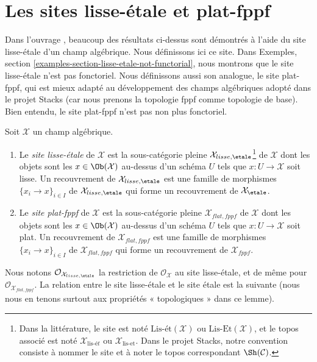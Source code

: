 \section{Les sites lisse-étale et plat-fppf}
\label{section-lisse-etale}

\noindent
Dans l'ouvrage \cite{LM-B}, beaucoup des résultats ci-dessus sont démontrés à l'aide du
site lisse-étale d'un champ algébrique. Nous définissons ici ce site.
Dans Exemples, section \ref{examples-section-lisse-etale-not-functorial},
nous montrons que le site lisse-étale n'est pas fonctoriel.
Nous définissons aussi son analogue, le site plat-fppf, qui est mieux adapté
au développement des champs algébriques adopté dans le projet Stacks
(car nous prenons la topologie fppf comme topologie de base). Bien entendu, le
site plat-fppf n'est pas non plus fonctoriel.

\begin{definition}
\label{definition-lisse-etale}
Soit $\mathcal{X}$ un champ algébrique.
\begin{enumerate}
\item Le {\it site lisse-étale} de $\mathcal{X}$ est la sous-catégorie pleine
$\mathcal{X}_{lisse,\etale}$\footnote{Dans la littérature, le
site est noté $\text{Lis-\'et}(\mathcal{X})$ ou
$\text{Lis-Et}(\mathcal{X})$, et le topos associé est noté
$\mathcal{X}_{\text{lis-\'e}t}$ ou $\mathcal{X}_{\text{lis-et}}$.
Dans le projet Stacks, notre convention consiste à nommer le site et à
noter le topos correspondant $\Sh(\mathcal{C})$.} de $\mathcal{X}$
dont les objets sont les $x \in \Ob(\mathcal{X})$ au-dessus d'un schéma $U$
tels que $x : U \to \mathcal{X}$ soit lisse. Un recouvrement de
$\mathcal{X}_{lisse,\etale}$ est une famille de morphismes
$\{x_i \to x\}_{i \in I}$ de $\mathcal{X}_{lisse,\etale}$
qui forme un recouvrement de $\mathcal{X}_\etale$.
\item Le {\it site plat-fppf} de $\mathcal{X}$ est la sous-catégorie pleine
$\mathcal{X}_{flat,fppf}$ de $\mathcal{X}$
dont les objets sont les $x \in \Ob(\mathcal{X})$ au-dessus d'un schéma $U$
tels que $x : U \to \mathcal{X}$ soit plat. Un recouvrement de
$\mathcal{X}_{flat,fppf}$ est une famille de morphismes
$\{x_i \to x\}_{i \in I}$ de $\mathcal{X}_{flat,fppf}$
qui forme un recouvrement de $\mathcal{X}_{fppf}$.
\end{enumerate}
\end{definition}

\noindent
Nous notons $\mathcal{O}_{\mathcal{X}_{lisse,\etale}}$
la restriction de $\mathcal{O}_\mathcal{X}$ au site lisse-étale,
et de même pour $\mathcal{O}_{\mathcal{X}_{flat,fppf}}$.
La relation entre le site lisse-étale et le site étale est
la suivante (nous nous en tenons surtout aux propriétés « topologiques » dans ce lemme).

